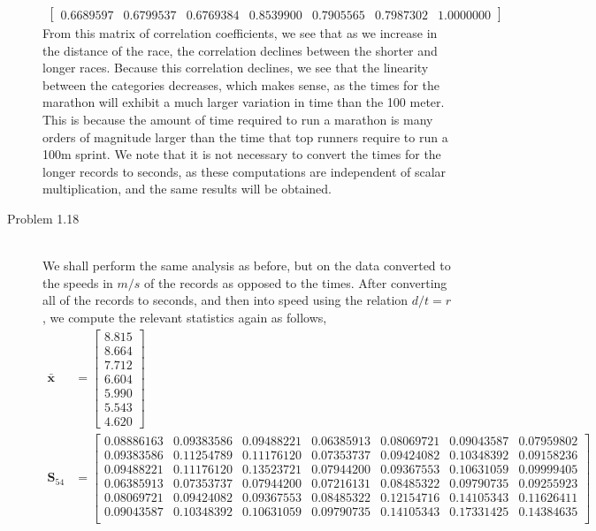 \documentclass[letterpaper,10pt]{article}
\begin{document}
\begin{description}
\begin{align*}
\begin{bmatrix}
0.6689597 & 0.6799537 & 0.6769384 & 0.8539900 & 0.7905565 & 0.7987302 & 1.0000000
\end{bmatrix}
\end{align*}
From this matrix of correlation coefficients, we see that as we increase in the distance of the race, the correlation declines between the shorter and longer races. Because this correlation declines, we see that the linearity between the categories decreases, which makes sense, as the times for the marathon will exhibit a much larger variation in time than the 100 meter. This is because the amount of time required to run a marathon is many orders of magnitude larger than the time that top runners require to run a 100m sprint. We note that it is not necessary to convert the times for the longer records to seconds, as these computations are independent of scalar multiplication, and the same results will be obtained.
\item[Problem 1.18]\hfill\\
We shall perform the same analysis as before, but on the data converted to the speeds in $m/s$ of the records as opposed to the times. After converting all of the records to seconds, and then into speed using the relation $d/t=r$, we compute the relevant statistics again as follows,
\begin{align*}
\bar{\textbf{x}} &= \begin{bmatrix}
8.815\\8.664\\7.712\\6.604\\5.990\\5.543\\4.620  
\end{bmatrix}\\
\textbf{S}_{54} &= \begin{bmatrix}
0.08886163 & 0.09383586 & 0.09488221 & 0.06385913 & 0.08069721 & 0.09043587 & 0.07959802\\
0.09383586 & 0.11254789 & 0.11176120 & 0.07353737 & 0.09424082 & 0.10348392 & 0.09158236\\
0.09488221 & 0.11176120 & 0.13523721 & 0.07944200 & 0.09367553 & 0.10631059 & 0.09999405\\
0.06385913 & 0.07353737 & 0.07944200 & 0.07216131 & 0.08485322 & 0.09790735 & 0.09255923\\
0.08069721 & 0.09424082 & 0.09367553 & 0.08485322 & 0.12154716 & 0.14105343 & 0.11626411\\
0.09043587 & 0.10348392 & 0.10631059 & 0.09790735 & 0.14105343 & 0.17331425 & 0.14384635\\

\end{bmatrix}
\end{align*}
\end{description}
\end{document}
